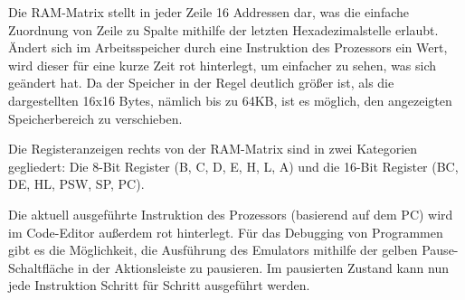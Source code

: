 Die \ac{RAM}-Matrix stellt in jeder Zeile 16 Addressen dar, was die einfache Zuordnung von Zeile zu Spalte mithilfe der letzten Hexadezimalstelle erlaubt. Ändert sich im Arbeitsspeicher durch eine Instruktion des Prozessors ein Wert, wird dieser für eine kurze Zeit rot hinterlegt, um einfacher zu sehen, was sich geändert hat. Da der Speicher in der Regel deutlich größer ist, als die dargestellten 16x16 Bytes, nämlich bis zu 64KB, ist es möglich, den angezeigten Speicherbereich zu verschieben.

Die Registeranzeigen rechts von der \ac{RAM}-Matrix sind in zwei Kategorien gegliedert: Die 8-Bit Register (B, C, D, E, H, L, A) und die 16-Bit Register (BC, DE, HL, PSW, SP, PC).

Die aktuell ausgeführte Instruktion des Prozessors (basierend auf dem \ac{PC}) wird im Code-Editor außerdem rot hinterlegt. Für das Debugging von Programmen gibt es die Möglichkeit, die Ausführung des Emulators mithilfe der gelben Pause-Schaltfläche in der Aktionsleiste zu pausieren. Im pausierten Zustand kann nun jede Instruktion Schritt für Schritt ausgeführt werden.